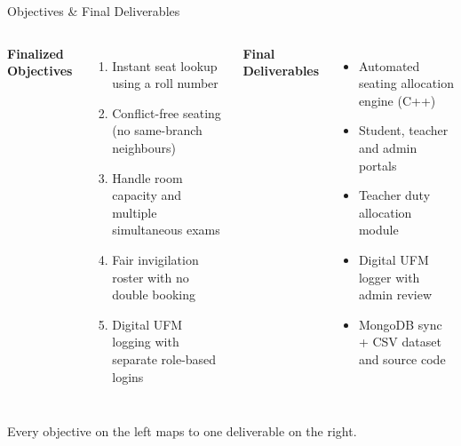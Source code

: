 \documentclass[aspectratio=169,11pt]{beamer}
\newcommand{\smallnote}[1]{%
\vspace{0.08cm}
{\scriptsize\color{GEUGrey}#1}
}
\begin{document}
\begin{frame}{Objectives \& Final Deliverables}

\begin{columns}[T,totalwidth=\textwidth]


\textbf{\color{GEUBlue}Finalized Objectives}

\begin{enumerate}\itemsep3pt
    \small
    \item Instant seat lookup using a roll number
    \item Conflict-free seating (no same-branch neighbours)
    \item Handle room capacity and multiple simultaneous exams
    \item Fair invigilation roster with no double booking
    \item Digital UFM logging with separate role-based logins
\end{enumerate}


\textbf{\color{GEUBlue}Final Deliverables}

\begin{itemize}\itemsep3pt
    \small
    \item Automated seating allocation engine (C++)
    \item Student, teacher and admin portals
    \item Teacher duty allocation module
    \item Digital UFM logger with admin review
    \item MongoDB sync + CSV dataset and source code
\end{itemize}

\end{columns}

\vfill

\smallnote{
Every objective on the left maps to one deliverable on the right.
}

\end{frame}
\end{document}
